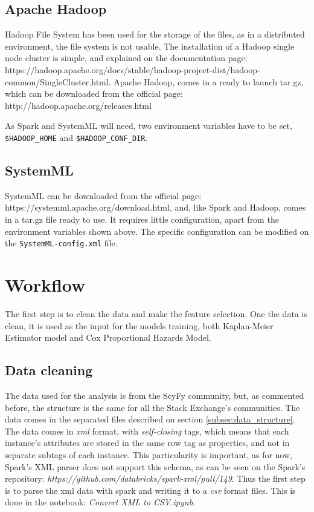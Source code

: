 \documentclass[11pt]{book} %
\newcommand{\code}[1]{\colorbox{codegray}{\texttt{#1}}}
\begin{document}
    \subsection{Apache Hadoop}

      Hadoop File System has been used for the storage of the files, as in a distributed environment, the file system is not usable. The installation of a Hadoop single node cluster is simple, and explained on the documentation page: https://hadoop.apache.org/docs/stable/hadoop-project-dist/hadoop-common/SingleCluster.html. Apache Hadoop, comes in a ready to launch tar.gz, which can be downloaded from the official page: http://hadoop.apache.org/releases.html

      As Spark and SystemML will need, two environment variables have to be set, \code{\$HADOOP\_HOME} and \code{\$HADOOP\_CONF\_DIR}.

    \subsection{SystemML}

      SystemML can be downloaded from the official page: https://systemml.apache.org/download.html, and, like Spark and Hadoop, comes in a tar.gz file ready to use. It requires little configuration, apart from the environment variables shown above. The specific configuration can be modified on the \code{SystemML-config.xml} file.

  \section{Workflow}

    The first step is to clean the data and make the feature selection. One the data is clean, it is used as the input for the models training, both Kaplan-Meier Estimator model and Cox Proportional Hazards Model.

  \subsection{Data cleaning}

    The data used for the analysis is from the ScyFy community, but, as commented before, the structure is the same for all the Stack Exchange's communities. The data comes in the separated files described on section \ref{subsec:data_structure}. The data comes in \emph{xml} format, with \emph{self-closing} tags, which means that each instance's attributes are stored in the same row tag as properties, and not in separate subtags of each instance. This particularity is important, as for now, Spark's XML parser does not support this schema, as can be seen on the Spark's repository: \emph{https://github.com/databricks/spark-xml/pull/149}. Thus the first step is to parse the xml data with spark and writing it to a \emph{csv} format files. This is done in the notebook: \emph{Convert XML to CSV.ipynb}.
\end{document}

